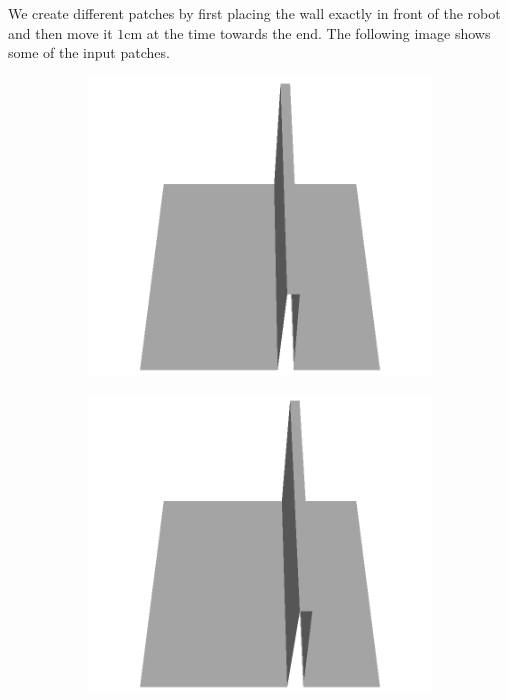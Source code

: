 \documentclass[../document.tex]{subfiles}
\begin{document}
We create different patches by first placing the wall exactly in front of the robot and then move it $1$cm at the time towards the end. The following image shows some of the input patches.
\begin{figure}
    \centering
    \begin{subfigure}[b]{0.160\textwidth}
    \includegraphics[width=\linewidth]{../img/5/custom_patches/walls_front/all/55-3d.png}
    \end{subfigure}
    \begin{subfigure}[b]{0.160\textwidth}
    \includegraphics[width=\linewidth]{../img/5/custom_patches/walls_front/all/50-3d.png}

\end{subfigure}
\end{figure}
\end{document}
